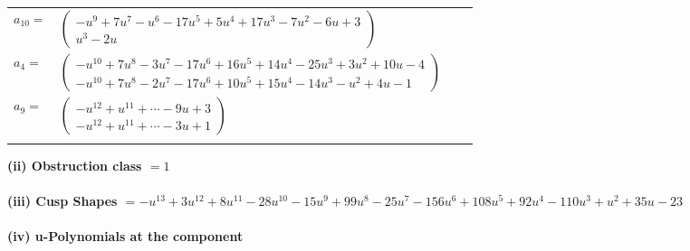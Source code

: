 \documentclass[1p]{elsarticle_modified}
\theoremstyle{definition}
\begin{document}
\begin{tabular}{m{7pt} m{180pt} m{7pt} m{180pt} }
\flushright $a_{10}=$&$\begin{pmatrix}- u^9+7 u^7- u^6-17 u^5+5 u^4+17 u^3-7 u^2-6 u+3\\u^3-2 u\end{pmatrix}$ \\
\flushright $a_{4}=$&$\begin{pmatrix}- u^{10}+7 u^8-3 u^7-17 u^6+16 u^5+14 u^4-25 u^3+3 u^2+10 u-4\\- u^{10}+7 u^8-2 u^7-17 u^6+10 u^5+15 u^4-14 u^3- u^2+4 u-1\end{pmatrix}$ \\
\flushright $a_{9}=$&$\begin{pmatrix}- u^{12}+u^{11}+\cdots-9 u+3\\- u^{12}+u^{11}+\cdots-3 u+1\end{pmatrix}$\\&\end{tabular}
\flushleft \textbf{(ii) Obstruction class $= 1$}\\~\\
\flushleft \textbf{(iii) Cusp Shapes $= - u^{13}+3 u^{12}+8 u^{11}-28 u^{10}-15 u^9+99 u^8-25 u^7-156 u^6+108 u^5+92 u^4-110 u^3+u^2+35 u-23$}\\~\\
\newpage\renewcommand{\arraystretch}{1}
\flushleft \textbf{(iv) u-Polynomials at the component}\newline \\
\end{document}
